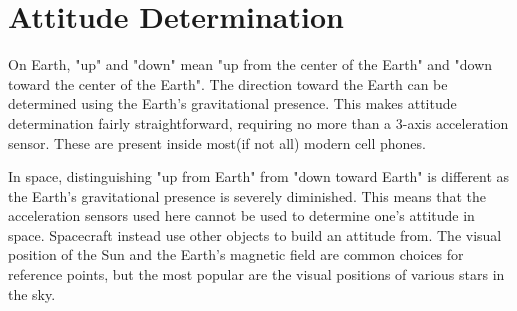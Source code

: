 \section{Attitude Determination}\label{sec:attitudeDetermination}
On Earth, "up" and "down" mean "up from the center of the Earth" and "down toward the center of the Earth". The
direction toward the Earth can be determined using the Earth's gravitational presence. This makes attitude
determination fairly straightforward, requiring no more than a 3-axis acceleration sensor. These are present inside
most(if not all) modern cell phones.

In space, distinguishing "up from Earth" from "down toward Earth" is different as the Earth's gravitational presence is
severely diminished. This means that the acceleration sensors used here cannot be used to determine one's attitude in
space. Spacecraft instead use other objects to build an attitude from. The visual position of the Sun and the Earth's
magnetic field are common choices for reference points, but the most popular are the visual positions of various stars
in the sky.

\begin{figure}
\end{figure}

